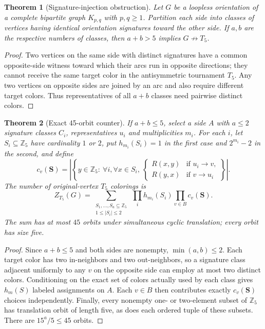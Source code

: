 \documentclass[11pt]{article}
\newtheorem{theorem}{Theorem}
\begin{document}
\begin{theorem}[Signature-injection obstruction]
Let $G$ be a loopless orientation of a complete bipartite graph $K_{p,q}$ with $p,q\ge1$. Partition each side into classes of vertices having identical orientation signatures toward the other side. If $a,b$ are the respective numbers of classes, then $a+b>5$ implies $G\not\to T_5$.
\end{theorem}
\begin{proof}
Two vertices on the same side with distinct signatures have a common opposite-side witness toward which their arcs run in opposite directions; they cannot receive the same target color in the antisymmetric tournament $T_5$. Any two vertices on opposite sides are joined by an arc and also require different target colors. Thus representatives of all $a+b$ classes need pairwise distinct colors.
\end{proof}

\begin{theorem}[Exact 45-orbit counter]
If $a+b\le5$, select a side $A$ with $a\le2$ signature classes $C_i$, representatives $u_i$ and multiplicities $m_i$. For each $i$, let $S_i\subseteq\mathbb Z_5$ have cardinality $1$ or $2$, put $h_{m_i}(S_i)=1$ in the first case and $2^{m_i}-2$ in the second, and define
\[
c_v(\mathbf S)=\left|\left\{y\in\mathbb Z_5:\ \forall i,\forall x\in S_i,\ \begin{cases}R(x,y)&\text{if }u_i\to v,\\R(y,x)&\text{if }v\to u_i\end{cases}\right\}\right|.
\]
The number of original-vertex $T_5$ colorings is
\[
Z_{T_5}(G)=\sum_{\substack{S_1,\dots,S_a\subseteq\mathbb Z_5\\1\le|S_i|\le2}}\ \prod_i h_{m_i}(S_i)\prod_{v\in B} c_v(\mathbf S).
\]
The sum has at most $45$ orbits under simultaneous cyclic translation; every orbit has size five.
\end{theorem}
\begin{proof}
Since $a+b\le5$ and both sides are nonempty, $\min(a,b)\le2$. Each target color has two in-neighbors and two out-neighbors, so a signature class adjacent uniformly to any $v$ on the opposite side can employ at most two distinct colors. Conditioning on the exact set of colors actually used by each class gives $h_m(S)$ labeled assignments on $A$. Each $v\in B$ then contributes exactly $c_v(\mathbf S)$ choices independently. Finally, every nonempty one- or two-element subset of $\mathbb Z_5$ has translation orbit of length five, as does each ordered tuple of these subsets. There are $15^a/5\le45$ orbits.
\end{proof}
\end{document}
